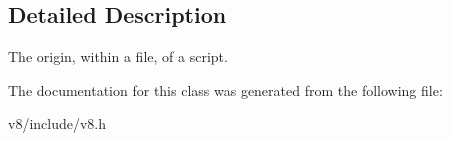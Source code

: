 \subsection{Detailed Description}
The origin, within a file, of a script. 

The documentation for this class was generated from the following file\-:\begin{DoxyCompactItemize}
\item 
v8/include/v8.\-h\end{DoxyCompactItemize}
